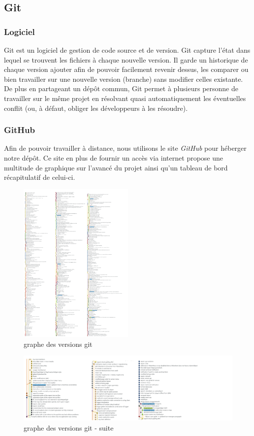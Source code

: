 \subsection{Git}
\subsubsection{Logiciel}
Git est un logiciel de gestion de code source et de version. Git capture l'état
dans lequel se trouvent les fichiers à chaque nouvelle version.
Il garde un historique de chaque version ajouter afin de pouvoir facilement revenir dessus, les comparer ou bien travailler sur une nouvelle version (branche) sans modifier celles existante.
De plus en partageant un dépôt commun, Git permet à plusieurs personne de travailler sur le même projet en résolvant quasi automatiquement les éventuelles conflit
(ou, à défaut, obliger les développeurs à les résoudre).

\subsubsection{GitHub}
Afin de pouvoir travailler à distance, nous utilisons le site \textit{GitHub} pour héberger notre dépôt.
Ce site en plus de fournir un accès via internet propose une multitude de graphique sur l'avancé du projet ainsi qu'un tableau de bord récapitulatif de celui-ci.

\begin{figure}[h!]
	\centering
	\includegraphics[width=0.5\textwidth]{img/state_git_graph.png}
	\caption{graphe des versions git}
\end{figure}

\newpage
\begin{figure}[h!]
	\centering
	\includegraphics[width=1.0\textwidth]{img/state_git_graph_2.png}
	\caption{graphe des versions git - suite}
	\label{fig:notification}
\end{figure}
